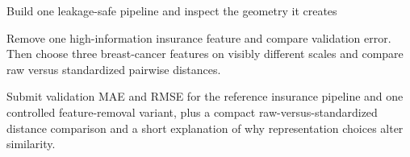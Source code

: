 \begin{labproject}{Build one leakage-safe pipeline and inspect the geometry it creates}
\begin{tryit}
Remove one high-information insurance feature and compare validation error. Then choose three breast-cancer features on visibly different scales and compare raw versus standardized pairwise distances.
\end{tryit}
\end{labproject}

\begin{labdeliverable}
Submit validation MAE and RMSE for the reference insurance pipeline and one controlled feature-removal variant, plus a compact raw-versus-standardized distance comparison and a short explanation of why representation choices alter similarity.
\end{labdeliverable}

